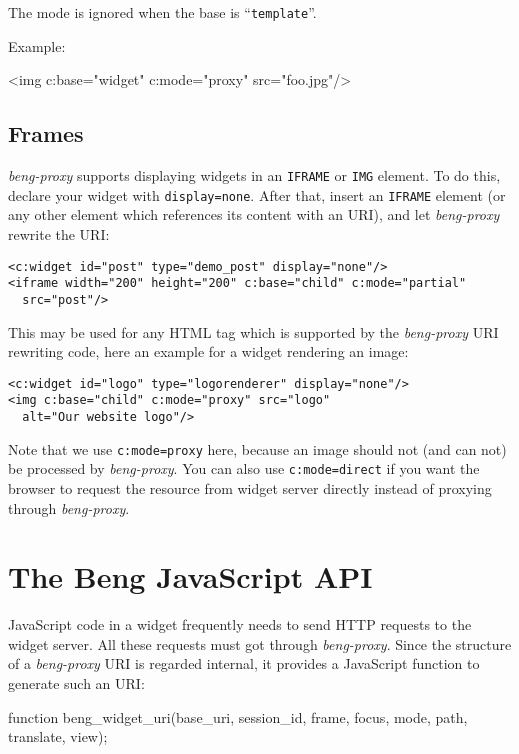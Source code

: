 \documentclass[a4paper,12pt]{article}
\begin{document}
The mode is ignored when the base is ``\texttt{template}''.

Example:

\begin{verbatim*}
<img c:base="widget" c:mode="proxy" src="foo.jpg"/>
\end{verbatim*}

\subsection{Frames}
\label{frames}

\emph{beng-proxy} supports displaying widgets in an \texttt{IFRAME} or
\texttt{IMG} element.  To do this, declare your widget with
\texttt{display=none}.  After that, insert an \texttt{IFRAME} element
(or any other element which references its content with an URI), and
let \emph{beng-proxy} rewrite the URI:

\begin{verbatim}
<c:widget id="post" type="demo_post" display="none"/>
<iframe width="200" height="200" c:base="child" c:mode="partial"
  src="post"/>
\end{verbatim}

This may be used for any HTML tag which is supported by the
\emph{beng-proxy} URI rewriting code, here an example for a widget
rendering an image:

\begin{verbatim}
<c:widget id="logo" type="logorenderer" display="none"/>
<img c:base="child" c:mode="proxy" src="logo"
  alt="Our website logo"/>
\end{verbatim}

Note that we use \texttt{c:mode=proxy} here, because an image should
not (and can not) be processed by \emph{beng-proxy}.  You can also use
\texttt{c:mode=direct} if you want the browser to request the resource
from widget server directly instead of proxying through
\emph{beng-proxy}.


\section{The Beng JavaScript API}

JavaScript code in a widget frequently needs to send HTTP requests to
the widget server.  All these requests must got through
\emph{beng-proxy}.  Since the structure of a \emph{beng-proxy} URI is
regarded internal, it provides a JavaScript function to generate such
an URI:

\begin{verbatim*}
function beng_widget_uri(base_uri, session_id, frame, focus, mode,
                         path, translate, view);
\end{verbatim*}
\end{document}
